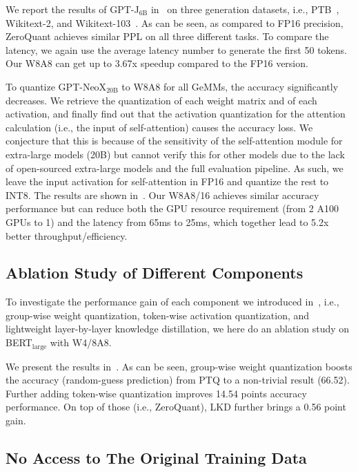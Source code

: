 We report the results of GPT-J$_{\text{6B}}$ in~ on three generation datasets, i.e., PTB~\cite{marcinkiewicz1994building}, Wikitext-2, and Wikitext-103~\cite{merity2016pointer}. As can be seen, as compared to FP16 precision, ZeroQuant achieves similar PPL on all three different tasks. To compare the latency, we again use the average latency number to generate the first 50 tokens. Our W8A8 can get up to 3.67x speedup compared to the FP16 version.

To quantize GPT-NeoX$_{\text{20B}}$ to W8A8 for all GeMMs, the accuracy significantly decreases. We retrieve the quantization of each weight matrix and of each activation, and finally find out that the activation quantization for the attention calculation (i.e., the input of self-attention) causes the accuracy loss. We conjecture that this is because of the sensitivity of the self-attention module for extra-large models (20B) but cannot verify this for other models due to the lack of open-sourced extra-large models and the full evaluation pipeline. As such, we leave the input activation for self-attention in FP16 and quantize the rest to INT8. The results are shown in~. 
Our W8A8/16 achieves similar accuracy performance but can reduce both the GPU resource requirement (from 2 A100 GPUs to 1) and the latency from 65ms to 25ms, which together lead to 5.2x better throughput/efficiency.

\subsection{Ablation Study of Different Components}
\label{sec:ablation_study_of_different_components}

To investigate the performance gain of each component we introduced in~, i.e., group-wise weight quantization, token-wise activation quantization, and lightweight layer-by-layer knowledge distillation, we here do an ablation study on BERT$_{\text{large}}$ with W4/8A8. 

We present the results in~.
As can be seen, group-wise weight quantization boosts the accuracy (random-guess prediction) from PTQ to a non-trivial result (66.52). Further adding token-wise quantization improves 14.54 points accuracy performance. On top of those (i.e., ZeroQuant), LKD further brings a 0.56 point gain. 

\subsection{No Access to The Original Training Data}
\label{sec:no_original_training_data}

